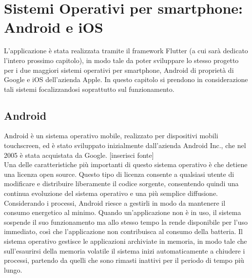\section{Sistemi Operativi per smartphone: \\ Android e iOS}
L'applicazione è stata realizzata tramite il framework Flutter (a cui sarà
dedicato l'intero prossimo capitolo), in modo tale da poter sviluppare lo stesso
progetto per i due maggiori sistemi operativi per smartphone, Android di
proprietà di Google e iOS dell'azienda Apple. In questo capitolo si prendono in
considerazione tali sistemi focalizzandosi soprattutto sul funzionamento.

\subsection{Android}
Android è un sistema operativo mobile, realizzato per dispositivi mobili
touchscreen, ed è stato sviluppato inizialmente dall'azienda Android Inc., che
nel 2005 è stata acquistata da Google. [inserisci fonte] \\
Una delle caratteristiche più importanti di questo sistema operativo è che
detiene una licenza open source. Questo tipo di licenza consente a
qualsiasi utente di modificare e distribuire liberamente il codice
sorgente, consentendo quindi una continua evoluzione del sistema operativo e una
più semplice diffusione. Considerando i processi, Android riesce a gestirli in
modo da mantenere il consumo energetico al minimo. Quando un’applicazione non è
in uso, il sistema sospende il suo funzionamento ma allo stesso tempo la rende
disponibile per l’uso immediato, così che l’applicazione non contribuisca
al consumo della batteria. Il sistema operativo gestisce le applicazioni archiviate in
memoria, in modo tale che sull'esaurirsi della memoria volatile il sistema inizi
automaticamente a chiudere i processi, partendo da quelli che sono rimasti
inattivi per il periodo di tempo più lungo.

